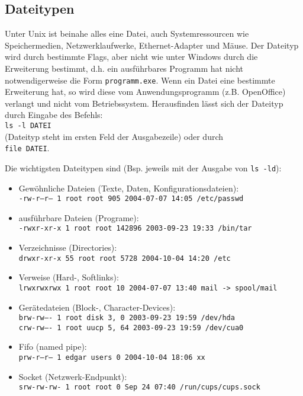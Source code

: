 \documentclass[11pt]{article}
\begin{document}
\subsection{Dateitypen}
Unter Unix ist beinahe alles eine Datei, auch Systemressourcen wie
Speichermedien, Netzwerklaufwerke, Ethernet-Adapter und Mäuse. Der
Dateityp wird durch bestimmte Flags, aber nicht wie unter Windows durch
die Erweiterung bestimmt, d.h. ein ausführbares Programm hat nicht
notwendigerweise die Form \texttt{programm.exe}. Wenn ein Datei eine
bestimmte Erweiterung hat, so wird diese vom Anwendungsprogramm (z.B.
OpenOffice) verlangt und nicht vom Betriebssystem. Herausfinden lässt
sich der Dateityp durch Eingabe des Befehls:\\
\texttt{ls -l DATEI} \\
(Dateityp steht im ersten Feld der Ausgabezeile) oder durch \\
\texttt{file DATEI}. 


Die wichtigsten Dateitypen sind (Bsp. jeweils mit der Ausgabe von
\texttt{ls -ld}):
\begin{itemize}
\item Gewöhnliche Dateien (Texte, Daten, Konfigurationsdateien):\\
\texttt{-rw-r--r--    1 root     root          905 2004-07-07 14:05
/etc/passwd}
\item ausführbare Dateien (Programe): \\
\texttt{-rwxr-xr-x    1 root     root       142896 2003-09-23 19:33
/bin/tar}
\item Verzeichnisse (Directories): \\
\texttt{drwxr-xr-x   55 root     root         5728 2004-10-04 14:20
/etc}
\item Verweise (Hard-, Softlinks): \\
\texttt{lrwxrwxrwx    1 root     root           10 2004-07-07 13:40 mail
-> spool/mail}
\item Gerätedateien (Block-, Character-Devices): \\
\texttt{brw-rw----    1 root     disk       3,   0 2003-09-23 19:59
/dev/hda} \\
\texttt{crw-rw----    1 root     uucp       5,  64 2003-09-23 19:59
/dev/cua0}
\item Fifo (named pipe): \\
\texttt{prw-r--r--    1 edgar    users           0 2004-10-04 18:06 xx}
\item Socket (Netzwerk-Endpunkt): \\
\texttt{srw-rw-rw- 1 root root 0 Sep 24 07:40 /run/cups/cups.sock}
\end{itemize}
\end{document}
